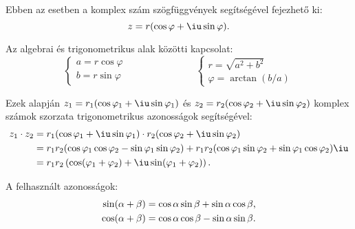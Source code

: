 \begin{blueBox}
  Ebben az esetben a komplex szám szögfüggvények segítségével fejezhető ki:
  \[
    z = r (\cos \varphi + \iu \sin \varphi)
    \text.
  \]

  Az algebrai és trigonometrikus alak közötti kapcsolat:
  \[
    \begin{cases}
      a = r \cos \varphi \\
      b = r \sin \varphi
    \end{cases}
    \hspace{3cm}
    \begin{cases}
      r = \sqrt{a^2 + b^2} \\
      \varphi = \arctan(b / a)
    \end{cases}
  \]

  Ezek alapján $z_1 = r_1 (\cos \varphi_1 + \iu \sin \varphi_1)$ és $z_2 = r_2 (
    \cos \varphi_2 + \iu \sin \varphi_2)$ komplex számok szorzata trigonometrikus
  azonosságok segítségével:
  \begin{align*}
    z_1 \cdot z_2
     & = r_1 (\cos \varphi_1 + \iu \sin \varphi_1) \cdot
    r_2 (\cos \varphi_2 + \iu \sin \varphi_2)
    \\
     & = r_1 r_2 (\cos \varphi_1 \cos \varphi_2 - \sin \varphi_1 \sin \varphi_2) +
    r_1 r_2 (\cos \varphi_1 \sin \varphi_2 + \sin \varphi_1 \cos \varphi_2) \iu
    \\
     & = r_1 r_2 \left(
    \cos(\varphi_1 + \varphi_2) + \iu \sin(\varphi_1 + \varphi_2)
    \right)
    \text.
  \end{align*}

  A felhasznált azonosságok:
  \begin{align*}
    \sin(\alpha + \beta) & = \cos \alpha \sin \beta + \sin \alpha \cos \beta
    \text,                                                                   \\
    \cos(\alpha + \beta) & =\cos \alpha \cos \beta - \sin \alpha \sin \beta
    \text.
  \end{align*}
\end{blueBox}

